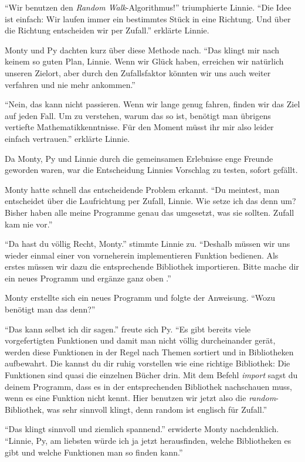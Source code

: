 \documentclass[a5paper,12pt,twoside,openright]{scrbook}
\begin{document}
"`Wir benutzen den \emph{Random Walk}-Algorithmus!"' triumphierte Linnie.
"`Die Idee ist einfach: Wir laufen immer ein bestimmtes Stück in eine Richtung. Und über die Richtung entscheiden wir per Zufall."' 
erklärte Linnie.

Monty und Py dachten kurz über diese Methode nach.
"`Das klingt mir nach keinem so guten Plan, Linnie.
Wenn wir Glück haben, erreichen wir natürlich unseren Zielort, aber 
durch den Zufallsfaktor könnten wir uns auch weiter verfahren und nie mehr ankommen."'

"`Nein, das kann nicht passieren.
Wenn wir lange genug fahren, finden wir das Ziel auf jeden Fall. 
Um zu verstehen, warum das so ist, benötigt man übrigens vertiefte Mathematikkenntnisse.
Für den Moment müsst ihr mir also leider einfach vertrauen."' erklärte Linnie.

Da Monty, Py und Linnie durch die gemeinsamen Erlebnisse enge Freunde geworden waren, 
war die Entscheidung Linnies Vorschlag zu testen, sofort gefällt.

Monty hatte schnell das entscheidende Problem erkannt.
"`Du meintest, man entscheidet über die Laufrichtung per Zufall, Linnie.
Wie setze ich das denn um? Bisher haben alle meine Programme genau das umgesetzt, was sie sollten.
Zufall kam nie vor."'

"`Da hast du völlig Recht, Monty."' stimmte Linnie zu.
"`Deshalb müssen wir uns wieder einmal einer von vorneherein implementieren Funktion bedienen.
Als erstes müssen wir dazu die entsprechende Bibliothek importieren.
Bitte mache dir ein neues Programm und ergänze ganz oben 
."'

Monty erstellte sich ein neues Programm und folgte der Anweisung.
"`Wozu benötigt man das denn?"'

"`Das kann selbst ich dir sagen."' freute sich Py.
"`Es gibt bereits viele vorgefertigten Funktionen und damit man nicht völlig durcheinander gerät, 
werden diese Funktionen in der Regel nach Themen sortiert und in Bibliotheken aufbewahrt.
Die kannst du dir ruhig vorstellen wie eine richtige Bibliothek: Die Funktionen sind quasi die einzelnen Bücher drin.
Mit dem Befehl \emph{import} sagst du deinem Programm, dass es in der entsprechenden Bibliothek nachschauen muss, wenn es 
eine Funktion nicht kennt. Hier benutzen wir jetzt also die \emph{random}-Bibliothek, was 
sehr sinnvoll klingt, denn random ist englisch für Zufall."'

"`Das klingt sinnvoll und ziemlich spannend."' erwiderte Monty nachdenklich.
"`Linnie, Py, am liebsten würde ich ja jetzt herausfinden, welche Bibliotheken es gibt und welche Funktionen man so finden kann."' 
\end{document}
